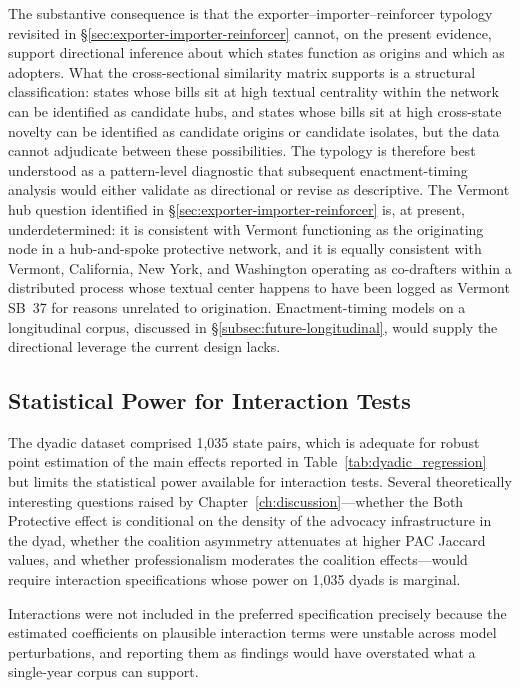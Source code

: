 The substantive consequence is that the exporter--importer--reinforcer typology revisited in \S\ref{sec:exporter-importer-reinforcer} cannot, on the present evidence, support directional inference about which states function as origins and which as adopters. What the cross-sectional similarity matrix supports is a structural classification: states whose bills sit at high textual centrality within the network can be identified as candidate hubs, and states whose bills sit at high cross-state novelty can be identified as candidate origins or candidate isolates, but the data cannot adjudicate between these possibilities. The typology is therefore best understood as a pattern-level diagnostic that subsequent enactment-timing analysis would either validate as directional or revise as descriptive. The Vermont hub question identified in \S\ref{sec:exporter-importer-reinforcer} is, at present, underdetermined: it is consistent with Vermont functioning as the originating node in a hub-and-spoke protective network, and it is equally consistent with Vermont, California, New York, and Washington operating as co-drafters within a distributed process whose textual center happens to have been logged as Vermont SB~37 for reasons unrelated to origination. Enactment-timing models on a longitudinal corpus, discussed in \S\ref{subsec:future-longitudinal}, would supply the directional leverage the current design lacks.

\subsection{Statistical Power for Interaction Tests}
\label{subsec:power-limits}
The dyadic dataset comprised 1{,}035 state pairs, which is adequate for robust point estimation of the main effects reported in Table~\ref{tab:dyadic_regression} but limits the statistical power available for interaction tests. Several theoretically interesting questions raised by Chapter~\ref{ch:discussion}---whether the Both Protective effect is conditional on the density of the advocacy infrastructure in the dyad, whether the coalition asymmetry attenuates at higher PAC Jaccard values, and whether professionalism moderates the coalition effects---would require interaction specifications whose power on 1{,}035 dyads is marginal.

Interactions were not included in the preferred specification precisely because the estimated coefficients on plausible interaction terms were unstable across model perturbations, and reporting them as findings would have overstated what a single-year corpus can support.

